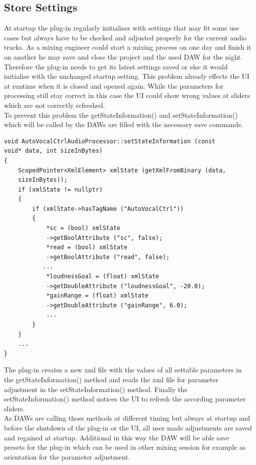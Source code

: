 \subsection{Store Settings}

At startup the plug-in regularly initialises with settings that may fit some use cases but always have to be checked and adjusted properly for the current audio tracks. As a mixing engineer could start a mixing process on one day and finish it on another he may save and close the project and the used DAW for the night. Therefore the plug-in needs to get its latest settings saved or else it would initialise with the unchanged startup setting. This problem already effects the UI at runtime when it is closed and opened again. While the parameters for processing still stay correct in this case the UI could show wrong values at sliders which are not correctly refreshed.\\
To prevent this problem the getStateInformation() and setStateInformation() which will be called by the DAWs are filled with the necessary save commands.\\

\begin{lstlisting}[frame=single]
void AutoVocalCtrlAudioProcessor::setStateInformation (const 
void* data, int sizeInBytes)
{
    ScopedPointer<XmlElement> xmlState (getXmlFromBinary (data, 
    sizeInBytes));
    if (xmlState != nullptr)
    {
        if (xmlState->hasTagName ("AutoVocalCtrl"))
        {
            *sc = (bool) xmlState
            ->getBoolAttribute ("sc", false);
            *read = (bool) xmlState
            ->getBoolAttribute ("read", false);
           ...
            *loudnessGoal = (float) xmlState
            ->getDoubleAttribute ("loudnessGoal", -20.0);
            *gainRange = (float) xmlState
            ->getDoubleAttribute ("gainRange", 6.0);
            ...
        }
    }
    ...
}
\end{lstlisting}

The plug-in creates a new xml file with the values of all settable parameters in the getStateInformation() method and reads the xml file for parameter adjustment in the setStateInformation() method. Finally the setStateInformation() method notices the UI to refresh the according parameter sliders.\\
As DAWs are calling those methods at different timing but always at startup and before the shutdown of the plug-in or the UI, all user made adjustments are saved and regained at startup. Additional in this way the DAW will be able save presets for the plug-in which can be used in other mixing session for example as orientation for the parameter adjustment.\\

